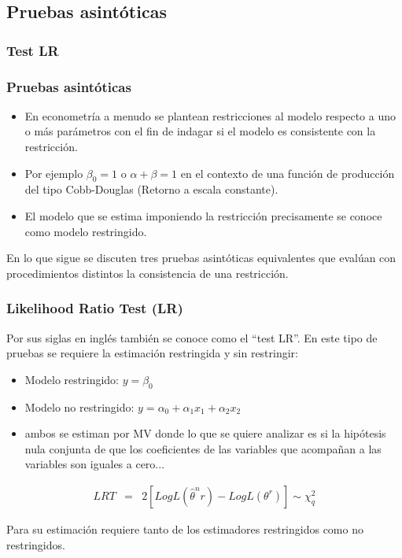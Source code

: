 \subsection{Pruebas asintóticas}

\subsubsection{Test LR}

\begin{frame}
	\frametitle{Pruebas asintóticas}
	\begin{itemize}
		\item En econometría a menudo se plantean restricciones al modelo
		respecto a uno o más parámetros con el fin de indagar si el modelo
		es consistente con la restricción. 
		\item Por ejemplo $\beta_0=1$ o
		$\alpha+\beta=1$ en el contexto de una función de producción del
		tipo Cobb-Douglas (Retorno a escala constante). 
		\item El modelo que se
		estima imponiendo la restricción precisamente se conoce como
		modelo restringido. 
	\end{itemize}
	
	En lo que sigue se discuten tres pruebas
	asintóticas equivalentes que evalúan con procedimientos distintos
	la consistencia de una restricción.
\end{frame}

\begin{frame}
	\frametitle{Likelihood Ratio Test (LR)}
	Por sus siglas en inglés también se conoce como el ``test LR''. En
	este tipo de pruebas se requiere la estimación restringida y sin
	restringir:
	\begin{itemize}
		\item Modelo restringido: $y=\beta_0$
		\item Modelo no restringido: $y=\alpha_0+\alpha_1 x_1+\alpha_2 x_2$
		\item ambos se estiman por MV donde lo que se quiere analizar
		es si la hipótesis nula conjunta de que los coeficientes de
		las variables que acompañan a las variables son iguales a
		cero...
	\end{itemize}
	\begin{eqnarray*}
		LRT &=& 2[Log L(\hat\theta^nr)-Log L(\theta^{r})] \sim \chi^2_q
	\end{eqnarray*}
	
	Para su estimación requiere tanto de los estimadores restringidos
	como no restringidos.
\end{frame}


